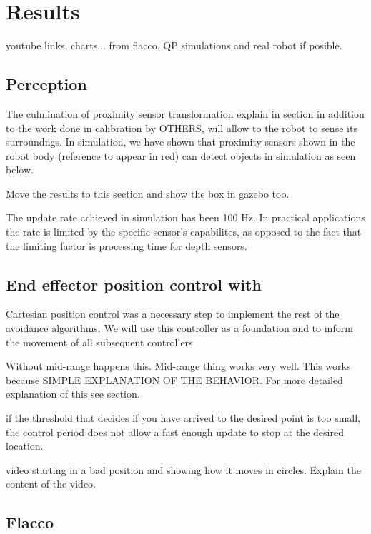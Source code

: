 \chapter{Results}
\label{resultschap}

youtube links, charts... from flacco, QP simulations and real robot if posible.

\section{Perception}

The culmination of proximity sensor transformation explain in section in addition to the work done in calibration by OTHERS, will allow to the robot to sense its surroundngs. In simulation, we have shown that proximity sensors shown in the robot body (reference to appear in red) can detect objects in simulation as seen below.

Move the results to this section and show the box in gazebo too.


The update rate achieved in simulation has been 100 Hz. In practical applications the rate is limited by the specific sensor's capabilites, as opposed to the fact that the limiting factor is processing time for depth sensors.

\section{End effector position control with }

Cartesian position control was a necessary step to implement the rest of the avoidance algorithms. We will use this controller as a foundation and to inform the movement of all subsequent controllers.

Without mid-range happens this. Mid-range thing works very well. This works because SIMPLE EXPLANATION OF THE BEHAVIOR. For more detailed explanation of this see section.

if the threshold that decides if you have arrived to the desired point is too small, the control period does not allow a fast enough update to stop at the desired location.

video starting in a bad position and showing how it moves in circles. Explain the content of the video.

\section{Flacco}


